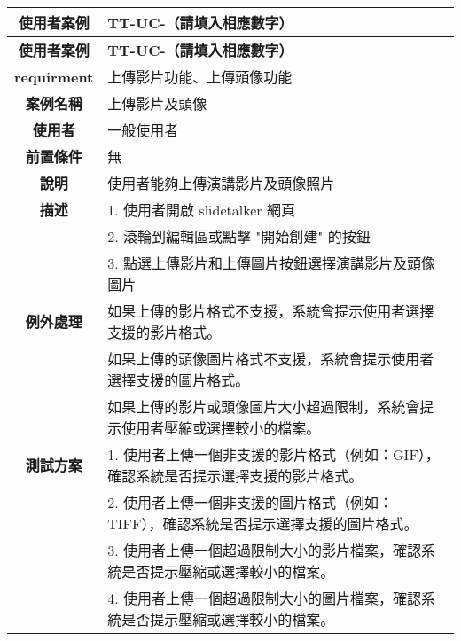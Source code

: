 \documentclass[12pt]{article}
\begin{document}
\begin{longtable}{|c|p{12.5cm}|}
  \hline
  \textbf{使用者案例} & \textbf{TT-UC-{}（請填入相應數字）} \\
  \hline
  \endfirsthead
  \hline
  \textbf{使用者案例} & \textbf{TT-UC-{}（請填入相應數字）} \\
  \hline
  \endhead
  \textbf{requirment} & 上傳影片功能、上傳頭像功能 \\
  \hline
  \textbf{案例名稱} & 上傳影片及頭像 \\
  \hline
  \textbf{使用者} & 一般使用者 \\
  \hline
  \textbf{前置條件} & 無 \\
  \hline
  \textbf{說明} & 使用者能夠上傳演講影片及頭像照片 \\
  \hline
  \textbf{描述} & 1. 使用者開啟 slidetalker 網頁 \\
               & 2. 滾輪到編輯區或點擊 "開始創建" 的按鈕 \\
               & 3. 點選上傳影片和上傳圖片按鈕選擇演講影片及頭像圖片 \\
  \hline
  \textbf{例外處理} & 如果上傳的影片格式不支援，系統會提示使用者選擇支援的影片格式。 \\
                    & 如果上傳的頭像圖片格式不支援，系統會提示使用者選擇支援的圖片格式。 \\
                    & 如果上傳的影片或頭像圖片大小超過限制，系統會提示使用者壓縮或選擇較小的檔案。 \\
  \hline
  \textbf{測試方案} & 1. 使用者上傳一個非支援的影片格式（例如：GIF），確認系統是否提示選擇支援的影片格式。 \\
                    & 2. 使用者上傳一個非支援的圖片格式（例如：TIFF），確認系統是否提示選擇支援的圖片格式。 \\
                    & 3. 使用者上傳一個超過限制大小的影片檔案，確認系統是否提示壓縮或選擇較小的檔案。 \\
                    & 4. 使用者上傳一個超過限制大小的圖片檔案，確認系統是否提示壓縮或選擇較小的檔案。 \\
  \hline
\end{longtable}
\end{document}
